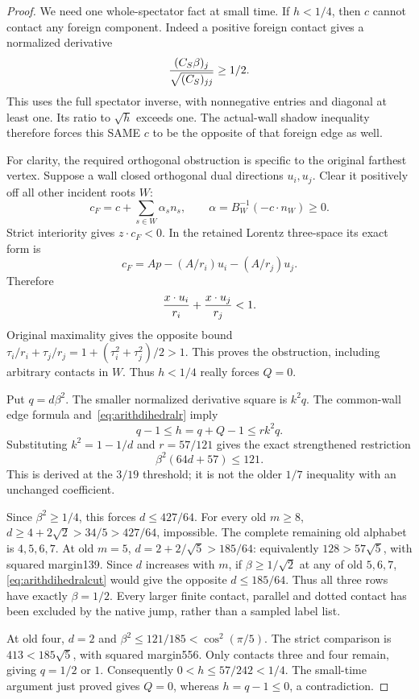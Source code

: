 \begin{proof}
We need one whole-spectator fact at small time.
If \(h<1/4\), then \(c\) cannot contact any foreign component.
Indeed a positive foreign contact gives a normalized derivative
\[
 {(C_S\beta)_j\over\sqrt{(C_S)_{jj}}}\ge1/2 .
\]
This uses the full spectator inverse, with nonnegative entries
and diagonal at least one.
Its ratio to \(\sqrt h\) exceeds one.
The actual-wall shadow inequality therefore forces this SAME
\(c\) to be the opposite of that foreign edge as well.

For clarity, the required orthogonal obstruction is specific to
the original farthest vertex.  Suppose a wall closed orthogonal
dual directions \(u_i,u_j\).
Clear it positively off all other incident roots \(W\):
\[
 c_F=c+\sum_{s\in W}\alpha_sn_s,\qquad
 \alpha=B_W^{-1}(-c\cdot n_W)\ge0.
\]
Strict interiority gives \(z\cdot c_F<0\).
In the retained Lorentz three-space its exact form is
\[
 c_F=A p-(A/r_i)u_i-(A/r_j)u_j .
\]
Therefore
\[
 {x\cdot u_i\over r_i}+{x\cdot u_j\over r_j}<1.
\]
Original maximality gives the opposite bound
\(\tau_i/r_i+\tau_j/r_j
 =1+(\tau_i^2+\tau_j^2)/2>1\).
This proves the obstruction, including arbitrary contacts in \(W\).
Thus \(h<1/4\) really forces \(Q=0\).

Put \(q=d\beta^2\).
The smaller normalized derivative square is \(k^2q\).
The common-wall edge formula and~\eqref{eq:arithdihedralr} imply
\[
 q-1\le h=q+Q-1\le rk^2q .
\]
Substituting \(k^2=1-1/d\) and \(r=57/121\) gives the exact
strengthened restriction
\[
                         \beta^2(64d+57)\le121 .
\tag{Dih2}\label{eq:arithdihedralcut}
\]
This is derived at the \(3/19\) threshold; it is not the older
\(1/7\) inequality with an unchanged coefficient.

Since \(\beta^2\ge1/4\), this forces \(d\le427/64\).
For every old \(m\ge8\),
\(d\ge4+2\sqrt2>34/5>427/64\), impossible.
The complete remaining old alphabet is \(4,5,6,7\).
At old \(m=5\),
\(d=2+2/\sqrt5>185/64\):
equivalently \(128>57\sqrt5\), with squared margin139.
Since \(d\) increases with \(m\), if
\(\beta\ge1/\sqrt2\) at any of old \(5,6,7\),
\eqref{eq:arithdihedralcut} would give the opposite
\(d\le185/64\).
Thus all three rows have exactly \(\beta=1/2\).
Every larger finite contact, parallel and dotted contact has
been excluded by the native jump, rather than a sampled label list.

At old four, \(d=2\) and
\(\beta^2\le121/185<\cos^2(\pi/5)\).
The strict comparison is \(413<185\sqrt5\), with squared
margin556.  Only contacts three and four remain, giving
\(q=1/2\) or \(1\).
Consequently \(0<h\le57/242<1/4\).
The small-time argument just proved gives \(Q=0\), whereas
\(h=q-1\le0\), a contradiction.


\end{proof}
